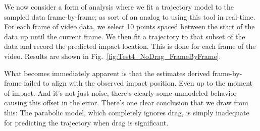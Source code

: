 We now consider a form of analysis where we fit a trajectory model to the sampled data frame-by-frame; as sort of an analog to using this tool in real-time. For each frame of video data, we select 10 points spaced between the start of the data up until the current frame. We then fit a trajectory to that subset of the data and record the predicted impact location. This is done for each frame of the video. Results are shown in Fig.~\ref{fig:Test4_NoDrag_FrameByFrame}. 

What becomes immediately apparent is that the estimates derived frame-by-frame failed to align with the observed impact position. Even up to the moment of impact. And it's not just noise, there's clearly some unmodeled behavior causing this offset in the error. There's one clear conclusion that we draw from this: The parabolic model, which completely ignores drag, is simply inadequate for predicting the trajectory when drag is significant. 

